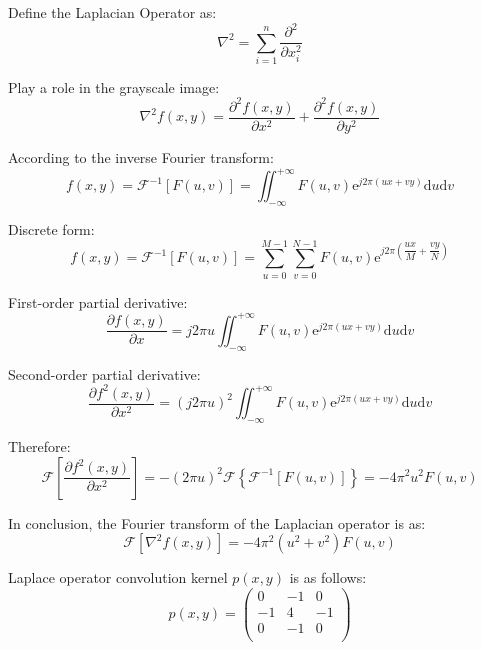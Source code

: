 \documentclass[12pt]{article}
\begin{document}
\thispagestyle{empty}

Define the Laplacian Operator as:
\[ \nabla^2=\displaystyle\sum_{i=1}^{n}\dfrac{\displaystyle\partial^2}{\displaystyle\partial x_{i}^{2}} \]

Play a role in the grayscale image:
\[ \nabla^2f(x,y)=\dfrac{\displaystyle\partial^2f(x,y)}{\displaystyle\partial x^2}+\dfrac{\displaystyle\partial^2f(x,y)}{\displaystyle\partial y^2} \]

According to the inverse Fourier transform:
\[ f(x,y)=\mathcal{F}^{-1}\left[F(u,v)\right]=\mathop{\iint}_{-\infty}^{+\infty}F(u,v)\text{e}^{j2\pi(ux+vy)}\text{d}u\text{d}v \]

Discrete form:
\[ f(x,y)=\mathcal{F}^{-1}\left[F(u,v)\right]=\sum_{u=0}^{M-1}\sum_{v=0}^{N-1}F(u,v)\text{e}^{\displaystyle j2\pi\left(\dfrac{ux}{M}+\dfrac{vy}{N}\right)} \]

First-order partial derivative:
\[ \dfrac{\partial f(x,y)}{\partial x}=j2\pi u\mathop{\iint}_{-\infty}^{+\infty}F(u,v)\text{e}^{j2\pi(ux+vy)}\text{d}u\text{d}v \]

Second-order partial derivative:
\[ \dfrac{\displaystyle\partial f^2(x,y)}{\partial x^2}=(j2\pi u)^2\mathop{\iint}_{-\infty}^{+\infty}F(u,v)\text{e}^{j2\pi(ux+vy)}\text{d}u\text{d}v \]

Therefore:
\[ \mathcal{F}\left[\dfrac{\displaystyle\partial f^2(x,y)}{\partial x^2}\right]=-(2\pi u)^2\mathcal{F}\left\{\mathcal{F}^{-1}\left[F(u,v)\right]\right\}=-4\pi^2u^2F(u,v) \]

In conclusion, the Fourier transform of the Laplacian operator is as:
\[ \mathcal{F}\left[\nabla^2f(x,y)\right]=-4\pi^2(u^2+v^2)F(u,v) \]

Laplace operator convolution kernel $p(x,y)$ is as follows:
\[ p(x,y)=\begin{pmatrix}
    0 & -1 & 0 \\
    -1 & 4 & -1 \\
    0 & -1 & 0 \\
\end{pmatrix} \]
\end{document}
